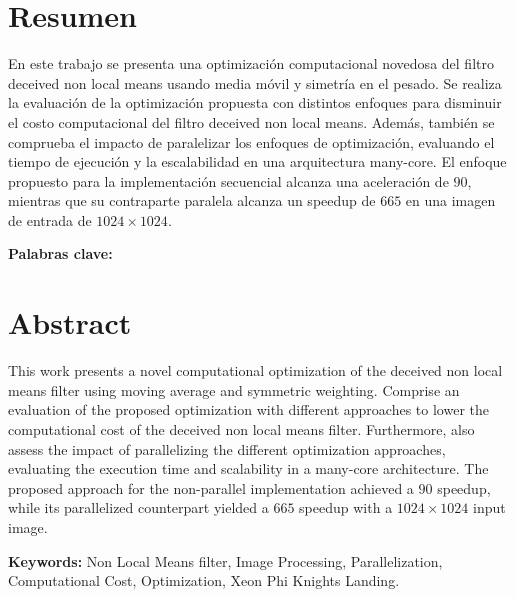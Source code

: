 \chapter*{Resumen}
\thispagestyle{empty}

En este trabajo se presenta una optimizaci\'on computacional novedosa del filtro deceived non local means usando media m\'ovil y simetr\'ia en el pesado. Se realiza la evaluaci\'on de la optimizaci\'on propuesta con distintos enfoques para disminuir el costo computacional del filtro deceived non local means. Adem\'as, tambi\'en se comprueba el impacto de paralelizar los enfoques de optimizaci\'on, evaluando el tiempo de ejecuci\'on y la escalabilidad en una arquitectura many-core. El enfoque propuesto para la implementaci\'on secuencial alcanza una aceleraci\'on de $90$, mientras que su contraparte paralela alcanza un speedup de $665$ en una imagen de entrada de $1024\times1024$.

\bigskip

\textbf{Palabras clave:} \scriptKeywords

\clearpage
\chapter*{Abstract}
\thispagestyle{empty}

This work presents a novel computational optimization of the deceived non local means filter using moving average and symmetric weighting. Comprise an evaluation of the proposed optimization with different approaches to lower the computational cost of the deceived non local means filter. Furthermore, also assess the impact of parallelizing the different optimization approaches, evaluating the execution time and scalability in a many-core architecture. The proposed approach for the non-parallel implementation achieved a $90$ speedup, while its parallelized counterpart yielded a $665$ speedup with a $1024\times1024$ input image. 

\bigskip

\textbf{Keywords:} Non Local Means filter, Image Processing, Parallelization, Computational Cost, Optimization, Xeon Phi Knights Landing.

\cleardoublepage

